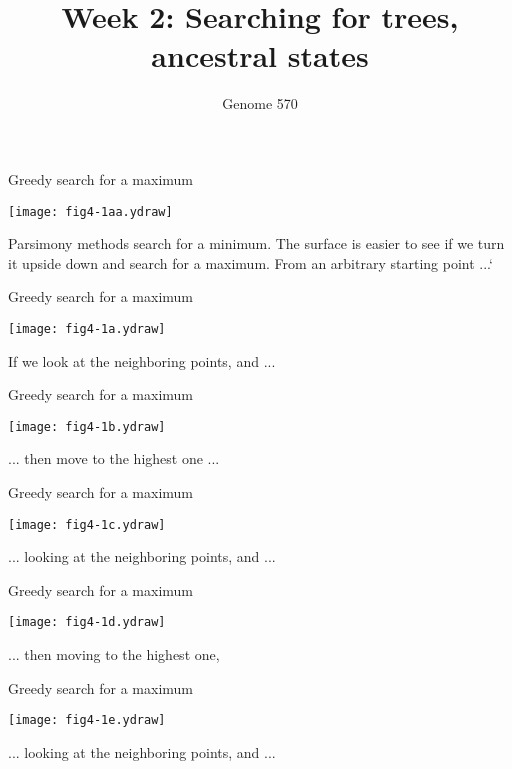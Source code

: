 \documentclass[bluish,slideColor,colorBG,pdf]{prosper}
\title{Week 2:  Searching for trees, ancestral states}
\author{Genome 570}
\begin{document}
\maketitle

\begin{slide}[Replace]{Greedy search for a maximum}

\centerline{\texttt{[image: fig4-1aa.ydraw]}}
\bigskip

Parsimony methods search for a minimum.  The surface is easier to see if we
turn it upside down and search for a maximum.  From an arbitrary starting point ...`

\end{slide}

\begin{slide}[Replace]{Greedy search for a maximum}

\centerline{\texttt{[image: fig4-1a.ydraw]}}
\bigskip

If we look at the neighboring points, and ...

\end{slide}

\begin{slide}[Replace]{Greedy search for a maximum}

\centerline{\texttt{[image: fig4-1b.ydraw]}}
\bigskip

... then move to the highest one ...

\end{slide}

\begin{slide}[Replace]{Greedy search for a maximum}

\centerline{\texttt{[image: fig4-1c.ydraw]}}
\bigskip

... looking at the neighboring points, and ...

\end{slide}

\begin{slide}[Replace]{Greedy search for a maximum}

\centerline{\texttt{[image: fig4-1d.ydraw]}}
\bigskip

... then moving to the highest one,

\end{slide}

\begin{slide}[Replace]{Greedy search for a maximum}

\centerline{\texttt{[image: fig4-1e.ydraw]}}
\bigskip

... looking at the neighboring points, and ...

\end{slide}
\end{document}
